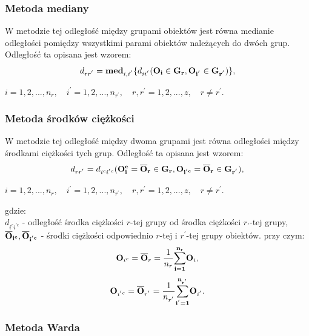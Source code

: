 \documentclass[12pt,a4paper]{report}
\begin{document}
\subsubsection{Metoda mediany}
\noindent

W metodzie tej odległość między grupami obiektów jest równa medianie odległości pomiędzy wszystkimi parami obiektów należących do dwóch grup. Odległość ta opisana jest wzorem: 
\begin{equation}
d_{rr^{'}}= \bold{med}_{i,i^{'}} \{d_{ii^{'}}(\bf{O_i} \in G_{r}, O_{i^{'}} \in G_{r^{'}})\},
\end{equation}
\begin{center}
$i=1,2,...,n_{r}, \quad i^{'}=1,2,...,n_{r^{'}}, \quad r,r^{'}=1,2,...,z, \quad r \neq r^{'}. $
\end{center}

\subsubsection{Metoda środków ciężkości}
\noindent

W metodzie tej odległość między dwoma grupami jest równa odległości między środkami ciężkości tych grup. Odległość ta opisana jest wzorem: 
\begin{equation}
d_{rr^{'}}=d_{i^{c}i^{'c}}(\bf{O_i^{c}}=\overline{O}_{r}\in G_{r}, O_{i^{'c}}=\overline{O}_{r} \in G_{r^{'}}),
\end{equation}
\begin{center}
$i=1,2,...,n_{r}, \quad i^{'}=1,2,...,n_{r^{'}}, \quad r,r^{'}=1,2,...,z, \quad r \neq r^{'}. $
\end{center}
gdzie:\\
$d_{i^{c}i^{'c}}$ - odległość środka ciężkości $r$-tej grupy od środka ciężkości $r_{'}$-tej grupy,\\
$\bf{\overline{O}_{i^{c}},\overline{O}_{i^{'c}}}$ - środki ciężkości odpowiednio $r$-tej i $r^{'}$-tej grupy obiektów. przy czym:
\begin{equation}
\bold{O}_{i^{c}}=\bold{\overline{O}}_{r}=\frac{1}{n_{r}}\bold{\sum_{i=1}^{n_{r}}} \bold{O}_{i},
\end{equation}
\begin{equation}
\bold{O}_{i^{'c}}=\bold{\overline{O}}_{r^{'}}=\frac{1}{n_{r^{'}}}\bold{\sum_{i^{'}=1}^{n_{r^{'}}}} \bold{O}_{i^{'}}.
\end{equation}

\subsubsection{Metoda Warda}
\noindent
\end{document}

